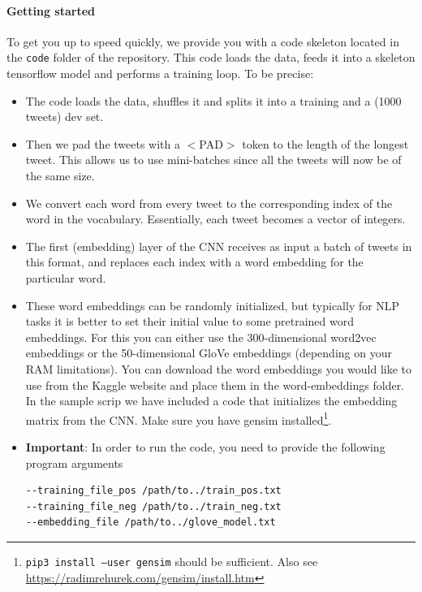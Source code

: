 \documentclass{article}
\begin{document}
\paragraph{Getting started} To get you up to speed quickly, we provide you with a code skeleton located in the \texttt{code} folder of the repository. This code loads the data, feeds it into a skeleton tensorflow model and performs a training loop.  To be precise:
\begin{itemize}
\item The code loads the data, shuffles it and splits it into a training and a (1000 tweets) dev set.
\item Then we pad the tweets with a $<$PAD$>$ token to the length of the longest tweet. This allows us to use mini-batches since all the tweets will now be of the same size.
\item We convert each word from every tweet to the corresponding index of the word in the vocabulary. Essentially, each tweet becomes a vector of integers.
\item 
The first (embedding) layer of the CNN receives as input a batch of tweets in this format, and replaces each index with a word embedding for the particular word.
\item These word embeddings can be randomly initialized, but typically for NLP tasks it is better to set their initial value to some pretrained word embeddings. For this you can either use the 300-dimensional word2vec embeddings or the 50-dimensional GloVe embeddings (depending on your RAM limitations). You can download the word embeddings you would like to use from the Kaggle website and place them in the word-embeddings folder. In the sample scrip we have included a code that initializes the embedding matrix from the CNN. Make sure you have gensim installed\footnote{\texttt{pip3 install --user gensim} should be sufficient. Also see \url{https://radimrehurek.com/gensim/install.htm}}.
\item \textbf{Important}: In order to run the code, you need to provide the following program arguments 	
\begin{verbatim}
--training_file_pos /path/to../train_pos.txt
--training_file_neg /path/to../train_neg.txt
--embedding_file /path/to../glove_model.txt
\end{verbatim}
\end{itemize}
\end{document}

